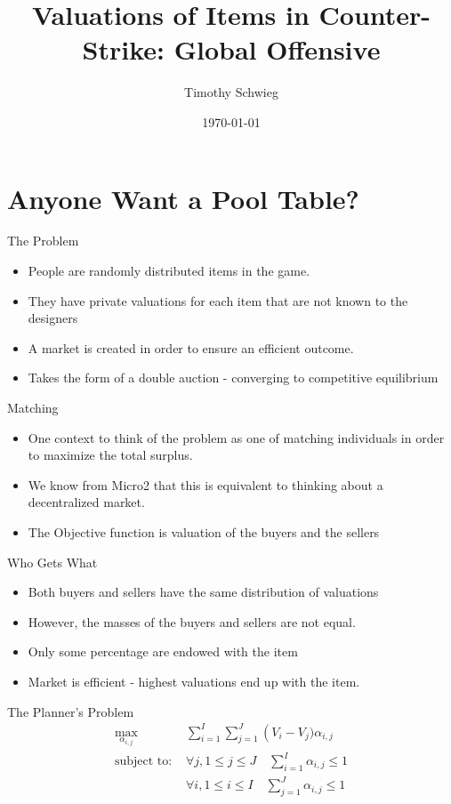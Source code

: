 \documentclass[bigger]{beamer}
\author{Timothy Schwieg}
\date{\today}
\title{Valuations of Items in Counter-Strike: Global Offensive}
\begin{document}
\maketitle

\section{Anyone Want a Pool Table?}
\label{sec-1}

\begin{frame}[label=sec-1-1]{The Problem}
\begin{itemize}
\item People are randomly distributed items in the game.
\item They have private valuations for each item that are not known to the
designers
\item A market is created in order to ensure an efficient outcome.
\item Takes the form of a double auction - converging to competitive equilibrium
\end{itemize}
\end{frame}

\begin{frame}[label=sec-1-2]{Matching}
\begin{itemize}
\item One context to think of the problem as one of matching individuals
in order to maximize the total surplus.
\item We know from Micro2 that this is equivalent to thinking about a
decentralized market.
\item The Objective function is valuation of the buyers and the sellers
\end{itemize}
\end{frame}

\begin{frame}[label=sec-1-3]{Who Gets What}
\begin{itemize}
\item Both buyers and sellers have the same distribution of valuations
\item However, the masses of the buyers and sellers are not equal.
\item Only some percentage are endowed with the item
\item Market is efficient - highest valuations end up with the item.
\end{itemize}
\end{frame}

\begin{frame}[label=sec-1-4]{The Planner's Problem}
\begin{align*}
\max_{\alpha_{i,j}} & \sum_{i=1}^I \sum_{j=1}^J \left ( V_i - V_j ) \alpha_{i,j} \\
\text{subject to: } & \forall j, 1 \leq j \leq J \quad \sum_{i=1}^I \alpha_{i,j} \leq 1 \\
& \forall i, 1 \leq i \leq I \quad \sum_{j=1}^J \alpha_{i,j} \leq 1\\
\end{align*}
\end{frame}
\end{document}
